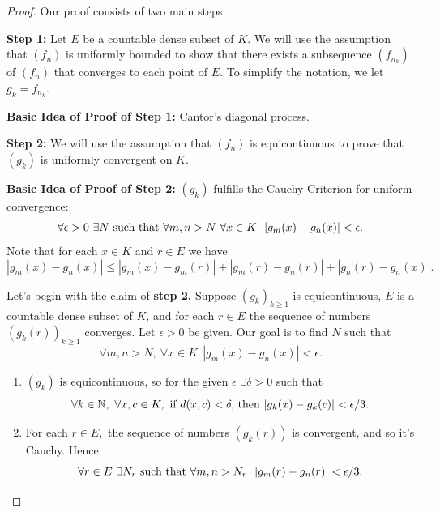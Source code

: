 \begin{proof}
    Our proof consists of two main steps.

    \textbf{Step 1: } Let $E$ be a countable dense subset of $K$. We will use the assumption that $(f_n)$ is uniformly bounded to show that there exists a subsequence $(f_{n_k})$ of $(f_n)$ that converges to each point of $E$. To simplify the notation, we let $g_k = f_{n_k}$.

    \textbf{Basic Idea of Proof of Step 1: } Cantor's diagonal process.

    \textbf{Step 2: } We will use the assumption that $(f_n)$ is equicontinuous to prove that $(g_k)$ is uniformly convergent on $K$.

    \textbf{Basic Idea of Proof of Step 2: } $(g_k)$ fulfills the Cauchy Criterion for uniform convergence:
    $$\forall \epsilon > 0 ~\exists N \text{ such that } \forall m, n > N ~\forall x \in K ~~|g_m(x) - g_n(x)| < \epsilon.$$
    Note that for each $x \in K$ and $r \in E$ we have
    \[|g_m(x) - g_n(x)| \leq |g_m(x) - g_m(r)| + |g_m(r) - g_n(r)| + |g_n(r) - g_n(x)|.\]

    Let's begin with the claim of \textbf{step 2.} Suppose $(g_k)_{k \geq 1}$ is equicontinuous, $E$ is a countable dense subset of $K$, and for each $r \in E$ the sequence of numbers $(g_k(r))_{k\geq 1}$ converges. Let $\epsilon > 0$ be given. Our goal is to find $N$ such that 
    \[\forall m,n > N, ~\forall x \in K~~|g_m(x) - g_n(x)| < \epsilon. \tag{$*$}\]
    \begin{enumerate}
        \item $(g_k)$ is equicontinuous, so for the given $\epsilon$ $\exists \delta > 0$ such that
        \[\forall k \in \mathbb{N}, ~\forall x, c \in K, \text{ if $d(x,c) < \delta,$ then $|g_k(x) - g_k(c)| < \epsilon / 3.$}\]

        \item For each $r \in E,$ the sequence of numbers $(g_k(r))$ is convergent, and so it's Cauchy. Hence
        $$\forall r \in E ~\exists N_r \text{ such that } \forall m, n > N_r ~~|g_m(r) - g_n(r)| < \epsilon / 3.$$
    \end{enumerate}


\end{proof}
